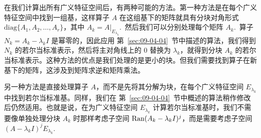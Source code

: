 在我们计算出所有广义特征空间后，有两种可能的方法。第一种方法是在每个广义特征空间中找到一组基，这样算子 $A$ 在这组基下的矩阵就具有分块对角形式 $\mathrm{diag}\{A_1, A_2, \dots, A_r\}$，其中 $A_k = A|_{E_{\lambda_k}}$.~然后我们可以分别处理每个矩阵 $A_k$.~算子 $N_k = A_k - \lambda_k I$ 是幂零的，因此应用 第~\ref{sec:09-04-04}~节中描述的算法，我们得到 $N_k$ 的若尔当标准表示，然后将主对角线上的 0 替换为 $\lambda_k$，就得到分块 $A_k$ 的若尔当标准表示。这种方法的优点是我们处理的是更小的块。但我们需要找到算子在新基下的矩阵，这涉及到矩阵求逆和矩阵乘法。



另一种方法是直接处理算子 $A$，而不是先将其分解为块，在每个广义特征空间 $E_{\lambda_k}$ 中找到若尔当标准基。同样，我们在 第~\ref{sec:09-04-04}~节中概述的算法稍作修改后仍然适用。也就是说，在为广义特征空间 $E_{\lambda_k}$ 计算若尔当标准基时，我们不需要像单独处理分块 $A_k$ 时那样考虑子空间 $\operatorname{Ran}(A_k - \lambda_k I)^j$，而是需要考虑子空间 $(A-\lambda_k I)^j E_{\lambda_k}$.~
